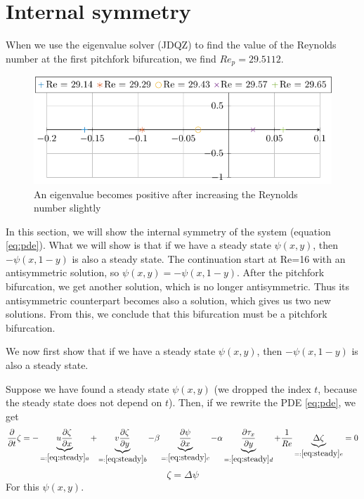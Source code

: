 \section{Internal symmetry}
When we use the eigenvalue solver (JDQZ) to find the value of the Reynolds number at the first pitchfork bifurcation, we find $Re_p=29.5112$. 

\begin{figure}
	\includegraphics[width=\textwidth]{images/eigenvalues.pdf}
	\caption{An eigenvalue becomes positive after increasing the Reynolds number slightly}
	\label{fig:eigenvaluespitch}
\end{figure}

In this section, we will show the internal symmetry of the system (equation \ref{eq:pde}). What we will show is that if we have a steady state $\psi(x,y)$, then $-\psi(x,1-y)$ is also a steady state. The continuation start at Re=16 with an antisymmetric solution, so $\psi(x,y)=-\psi(x,1-y)$. After the pitchfork bifurcation, we get another solution, which is no longer antisymmetric. Thus its antisymmetric counterpart becomes also a solution, which gives us two new solutions. From this, we conclude that this bifurcation must be a pitchfork bifurcation.
 
 We now first show that if we have a steady state $\psi(x,y)$, then $-\psi(x,1-y)$ is also a steady state.
 
Suppose we have found a steady state $\psi(x,y)$ (we dropped the index $t$, because the steady state does not depend on $t$). Then, if we rewrite the PDE \ref{eq:pde}, we get
 \begin{equation}
   \frac{\partial}{\partial t}\zeta= - \underbrace{   u \frac{\partial\zeta}{\partial x}}_{=:\ref{eq:steady} a} +\underbrace{  v \frac{\partial\zeta}{\partial y}}_{=:\ref{eq:steady}b} - \beta \underbrace{\frac{\partial \psi}{\partial x} }_{=:\ref{eq:steady}c} - \alpha\underbrace{ \frac{\partial \tau_x}{\partial y}}_{=:\ref{eq:steady} d} +\frac{1}{Re}  \underbrace{\Delta \zeta}_{=:\ref{eq:steady}e}=0\label{eq:steady}
\end{equation}
 $$\zeta=\Delta \psi $$
For this $\psi(x,y)$.

